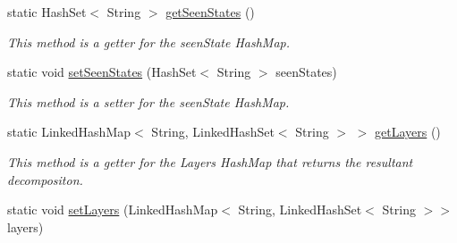 \begin{DoxyCompactItemize}
\item 
\hypertarget{classese_1_1seas_1_1upenn_1_1edu_1_1_planar_separator_a54e7709f8e3ce93f4ab73711ed5d6c44}{}static Hash\+Set$<$ String $>$ \hyperlink{classese_1_1seas_1_1upenn_1_1edu_1_1_planar_separator_a54e7709f8e3ce93f4ab73711ed5d6c44}{get\+Seen\+States} ()\label{classese_1_1seas_1_1upenn_1_1edu_1_1_planar_separator_a54e7709f8e3ce93f4ab73711ed5d6c44}

\begin{DoxyCompactList}\small\item\em This method is a getter for the seen\+State Hash\+Map. \end{DoxyCompactList}\item 
\hypertarget{classese_1_1seas_1_1upenn_1_1edu_1_1_planar_separator_af92505f765082aa8bb7cbd2e77d5ef29}{}static void \hyperlink{classese_1_1seas_1_1upenn_1_1edu_1_1_planar_separator_af92505f765082aa8bb7cbd2e77d5ef29}{set\+Seen\+States} (Hash\+Set$<$ String $>$ seen\+States)\label{classese_1_1seas_1_1upenn_1_1edu_1_1_planar_separator_af92505f765082aa8bb7cbd2e77d5ef29}

\begin{DoxyCompactList}\small\item\em This method is a setter for the seen\+State Hash\+Map. \end{DoxyCompactList}\item 
\hypertarget{classese_1_1seas_1_1upenn_1_1edu_1_1_planar_separator_a431b40bb673f68e12c58b018e80a07ef}{}static Linked\+Hash\+Map$<$ String, Linked\+Hash\+Set$<$ String $>$ $>$ \hyperlink{classese_1_1seas_1_1upenn_1_1edu_1_1_planar_separator_a431b40bb673f68e12c58b018e80a07ef}{get\+Layers} ()\label{classese_1_1seas_1_1upenn_1_1edu_1_1_planar_separator_a431b40bb673f68e12c58b018e80a07ef}

\begin{DoxyCompactList}\small\item\em This method is a getter for the Layers Hash\+Map that returns the resultant decompositon. \end{DoxyCompactList}\item 
\hypertarget{classese_1_1seas_1_1upenn_1_1edu_1_1_planar_separator_a4cfee899eb14ed85e85ac4005613f343}{}static void \hyperlink{classese_1_1seas_1_1upenn_1_1edu_1_1_planar_separator_a4cfee899eb14ed85e85ac4005613f343}{set\+Layers} (Linked\+Hash\+Map$<$ String, Linked\+Hash\+Set$<$ String $>$$>$ layers)\label{classese_1_1seas_1_1upenn_1_1edu_1_1_planar_separator_a4cfee899eb14ed85e85ac4005613f343}


\end{DoxyCompactItemize}
